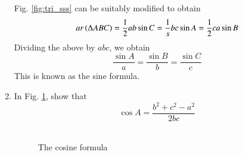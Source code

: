 \begin{enumerate}[label=\arabic*.,ref=\thesubsection.\theenumi]
\solution Fig. \ref{fig:tri_sss} can be suitably modified to obtain 
\begin{equation}
ar\left(\Delta ABC\right) = \frac{1}{2}ab\sin C = \frac{1}{s}bc\sin A = \frac{1}{2}ca\sin B
\end{equation}
Dividing the above by $abc$, we obtain
	\begin{equation}
\label{eq:tri_sin_form}
	\frac{\sin A}{a} = \frac{\sin B}{b} = \frac{\sin C}{c}
	\end{equation}
This is known as the sine formula.	
%
\item
In Fig. \ref{fig:tri_cosine_formula}, show that
%
\begin{equation}
\label{eq:tri_cos_form}
\cos A = \frac{b^2+c^2-a^2}{2bc}
\end{equation}
%
\

\begin{figure}[!ht]
	\begin{center}
		
		\resizebox{\columnwidth}{!}{}
	\end{center}
	\caption{The cosine formula}
	\label{fig:tri_cosine_formula}	
\end{figure}


\end{enumerate}
